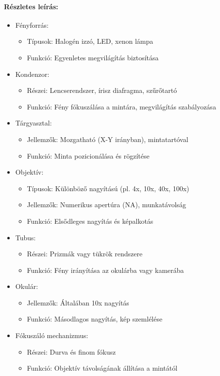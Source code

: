 \documentclass[a4paper,12pt]{article}
\begin{document}
\paragraph{Részletes leírás:} \begin{itemize} \item Fényforrás: \begin{itemize} \item Típusok: Halogén izzó, LED, xenon lámpa \item Funkció: Egyenletes megvilágítás biztosítása \end{itemize} \item Kondenzor: \begin{itemize} \item Részei: Lencserendszer, írisz diafragma, szűrőtartó \item Funkció: Fény fókuszálása a mintára, megvilágítás szabályozása \end{itemize} \item Tárgyasztal: \begin{itemize} \item Jellemzők: Mozgatható (X-Y irányban), mintatartóval \item Funkció: Minta pozicionálása és rögzítése \end{itemize} \item Objektív: \begin{itemize} \item Típusok: Különböző nagyítású (pl. 4x, 10x, 40x, 100x) \item Jellemzők: Numerikus apertúra (NA), munkatávolság \item Funkció: Elsődleges nagyítás és képalkotás \end{itemize} \item Tubus: \begin{itemize} \item Részei: Prizmák vagy tükrök rendszere \item Funkció: Fény irányítása az okulárba vagy kamerába \end{itemize} \item Okulár: \begin{itemize} \item Jellemzők: Általában 10x nagyítás \item Funkció: Másodlagos nagyítás, kép szemlélése \end{itemize} \item Fókuszáló mechanizmus: \begin{itemize} \item Részei: Durva és finom fókusz \item Funkció: Objektív távolságának állítása a mintától \end{itemize} \end{itemize}
\end{document}
